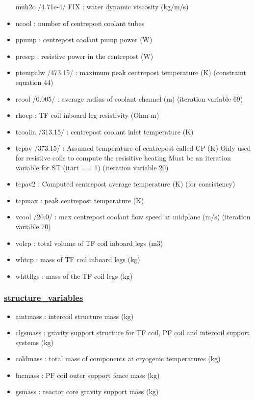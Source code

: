 \documentclass[]{article}
\providecommand{\tightlist}{%
  \setlength{\itemsep}{0pt}\setlength{\parskip}{0pt}}
\begin{document}
\begin{itemize}
  muh2o /4.71e-4/ FIX : water dynamic viscosity (kg/m/s)
\item
  ncool : number of centrepost coolant tubes
\item
  ppump : centrepost coolant pump power (W)
\item
  prescp : resistive power in the centrepost (W)
\item
  ptempalw /473.15/ : maximum peak centrepost temperature (K)
  (constraint equation 44)
\item
  rcool /0.005/ : average radius of coolant channel (m) (iteration
  variable 69)
\item
  rhocp : TF coil inboard leg resistivity (Ohm-m)
\item
  tcoolin /313.15/ : centrepost coolant inlet temperature (K)
\item
  tcpav /373.15/ : Assumed temperature of centrepost called CP (K) Only
  used for resistive coils to compute the resisitive heating Must be an
  iteration variable for ST (itart == 1) (iteration variable 20)
\item
  tcpav2 : Computed centrepost average temperature (K) (for consistency)
\item
  tcpmax : peak centrepost temperature (K)
\item
  vcool /20.0/ : max centrepost coolant flow speed at midplane (m/s)
  (iteration variable 70)
\item
  volcp : total volume of TF coil inboard legs (m3)
\item
  whtcp : mass of TF coil inboard legs (kg)
\item
  whttflgs : mass of the TF coil legs (kg)
\end{itemize}

\subsubsection{\texorpdfstring{\href{structure_variables.html}{structure\_variables}}{structure\_variables}}\label{structure_variables}

\begin{itemize}
\tightlist
\item
  aintmass : intercoil structure mass (kg)
\item
  clgsmass : gravity support structure for TF coil, PF coil and
  intercoil support systems (kg)
\item
  coldmass : total mass of components at cryogenic temperatures (kg)
\item
  fncmass : PF coil outer support fence mass (kg)
\item
  gsmass : reactor core gravity support mass (kg)
\end{itemize}
\end{document}
